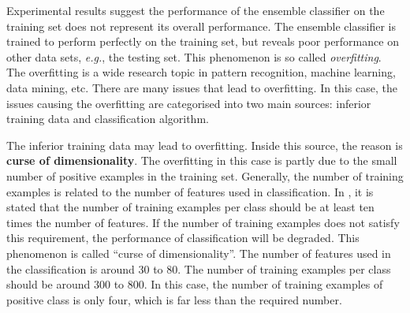 \documentclass[a4paper,10pt]{article}
\begin{document}
Experimental results suggest the performance of the ensemble classifier on the training set does not represent its overall performance. The ensemble classifier is trained to perform perfectly on the training set, but reveals poor performance on other data sets, \textit{e.g.}, the testing set. This phenomenon is so called \textit{overfitting}. The overfitting is a wide research topic in pattern recognition, machine learning, data mining, etc. There are many issues that lead to overfitting. In this case, the issues causing the overfitting are categorised into two main sources: inferior training data and classification algorithm.

The inferior training data may lead to overfitting. Inside this source, the reason is \textbf{curse of dimensionality}. The overfitting in this case is partly due to the small number of positive examples in the training set. Generally, the number of training examples is related to the number of features used in classification. In \cite{Jain2000}, it is stated that the number of training examples per class should be at least ten times the number of features. If the number of training examples does not satisfy this requirement, the performance of classification will be degraded. This phenomenon is called ``curse of dimensionality''. The number of features used in the classification is around $30$ to $80$. The number of training examples per class should be around $300$ to $800$. In this case, the number of training examples of positive class is only four, which is far less than the required number. 
\end{document}
